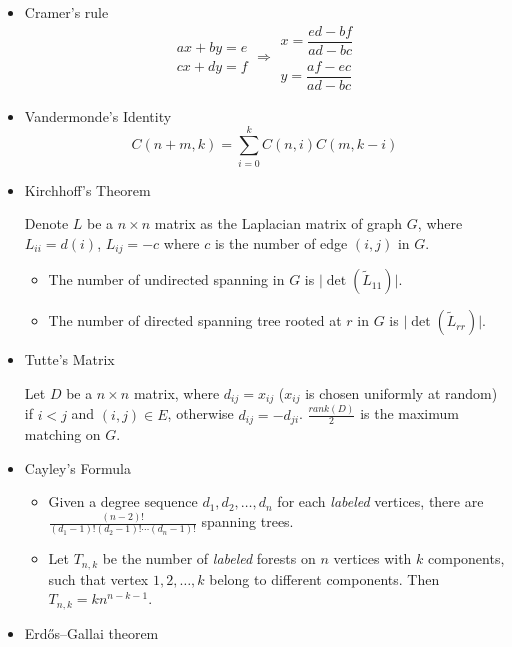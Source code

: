 \begin{itemize}
\item Cramer's rule
$$
\begin{aligned}ax+by=e\\cx+dy=f\end{aligned}
\Rightarrow
\begin{aligned}x=\dfrac{ed-bf}{ad-bc}\\y=\dfrac{af-ec}{ad-bc}\end{aligned}
$$

\item Vandermonde's Identity
$$
C(n + m, k) = \sum_{i=0}^k C(n, i)C(m, k - i)
$$

\item Kirchhoff's Theorem

Denote $L$ be a $n \times n$ matrix as the Laplacian matrix of graph $G$, where $L_{ii} = d(i)$, $L_{ij} = -c$ where $c$ is the number of edge $(i, j)$ in $G$.
\begin{itemize}
    \itemsep-0.5em
    \item The number of undirected spanning in $G$ is $\lvert \det(\tilde{L}_{11}) \rvert$.
    \item The number of directed spanning tree rooted at $r$ in $G$ is $\lvert \det(\tilde{L}_{rr}) \rvert$.
\end{itemize}

\item Tutte's Matrix

Let $D$ be a $n \times n$ matrix, where $d_{ij} = x_{ij}$ ($x_{ij}$ is chosen uniformly at random) if $i < j$ and $(i, j) \in E$, otherwise $d_{ij} = -d_{ji}$. $\frac{rank(D)}{2}$ is the maximum matching on $G$.

\item Cayley's Formula

\begin{itemize}
    \itemsep-0.5em
  \item Given a degree sequence $d_1, d_2, \ldots, d_n$ for each \textit{labeled} vertices, there are $\frac{(n - 2)!}{(d_1 - 1)!(d_2 - 1)!\cdots(d_n - 1)!}$ spanning trees.
  \item Let $T_{n, k}$ be the number of \textit{labeled} forests on $n$ vertices with $k$ components, such that vertex $1, 2, \ldots, k$ belong to different components. Then $T_{n, k} = kn^{n - k - 1}$.
\end{itemize}

\item Erdős–Gallai theorem 


\end{itemize}
